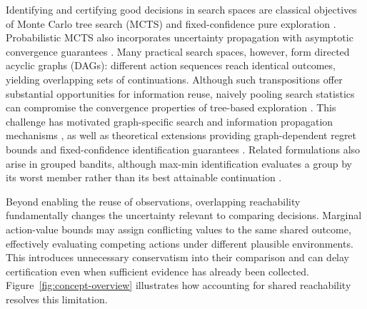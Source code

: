 \documentclass{article}
\theoremstyle{plain}
\theoremstyle{definition}
\begin{document}
Identifying and certifying good decisions in search spaces
are classical objectives of Monte Carlo tree search (MCTS)
and fixed-confidence pure exploration
\citep{uctoriginal,kaufmann,garivier2016optimal,nameki2026thresholding}.
Probabilistic MCTS also incorporates uncertainty propagation with
asymptotic convergence guarantees
\citep{tesauro2010bayesian,dam2025wasserstein}.
Many practical search spaces, however, form directed acyclic
graphs (DAGs): different action sequences reach identical outcomes,
yielding overlapping sets of continuations. Although such
transpositions offer substantial opportunities for information
reuse, naively pooling search statistics can compromise the
convergence properties of tree-based exploration
\citep{childs2008transpositions,saffidine2012ucd}.
This challenge has motivated graph-specific search and information
propagation mechanisms \citep{czech2021mcgs,kujanpaa2024cmcgs},
as well as theoretical extensions providing graph-dependent regret
bounds and fixed-confidence identification guarantees
\citep{leurent2020graph,huang,pelissier}.
Related formulations also arise in grouped bandits, although max-min
identification evaluates a group by its worst member rather than
its best attainable continuation \citep{wang2022grouped}.

Beyond enabling the reuse of observations, overlapping reachability
fundamentally changes the uncertainty relevant to comparing decisions.
Marginal action-value bounds may assign conflicting values to the
same shared outcome, effectively evaluating competing actions under
different plausible environments. This introduces unnecessary
conservatism into their comparison and can delay certification even
when sufficient evidence has already been collected.
Figure~\ref{fig:concept-overview} illustrates how accounting for
shared reachability resolves this limitation.
\end{document}
